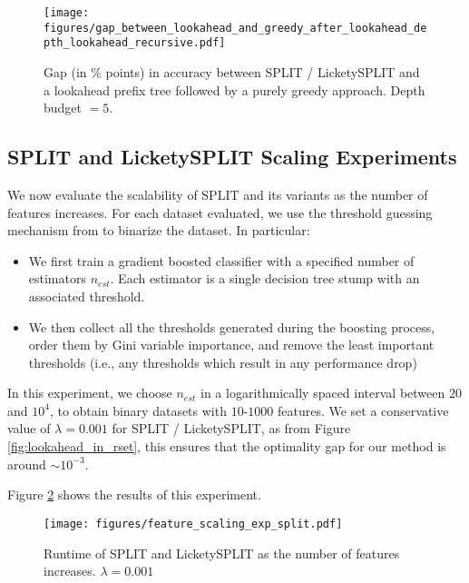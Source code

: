 \begin{figure}[H]
    \centering
    \texttt{[image: figures/gap\_between\_lookahead\_and\_greedy\_after\_lookahead\_depth\_lookahead\_recursive.pdf]}
    \caption{Gap (in $\%$ points) in accuracy between SPLIT / LicketySPLIT and a lookahead prefix tree followed by a purely greedy approach. Depth budget $= 5$. }\label{fig:gap_between_lookahead_and_greedy_after_lookahead_depth_lookahead_recursive}
\end{figure}
\subsection{SPLIT and LicketySPLIT Scaling Experiments}
\label{sec:split_scaling}
We now evaluate the scalability of SPLIT and its variants as the number of features increases. For each dataset evaluated, we use the threshold guessing mechanism from \cite{gosdt_guesses} to binarize the dataset. In particular:
\begin{itemize}
    \item We first train a gradient boosted classifier with a specified number of estimators $n_{est}$. Each estimator is a single decision tree stump with an associated threshold. 
    \item We then collect all the thresholds generated during the boosting process, order them by Gini variable importance, and remove the least important thresholds (i.e., any thresholds which result in any performance drop)
\end{itemize}
In this experiment, we choose $n_{est}$ in a logarithmically spaced interval between $20$ and $10^4$, to obtain binary datasets with $10$-$1000$ features. We set a conservative value of $\lambda = 0.001$ for SPLIT / LicketySPLIT, as from Figure \ref{fig:lookahead_in_rset}, this ensures that the optimality gap for our method is around $\sim 10^{-3}$.

Figure \ref{fig:feature_scaling_exp_split} shows the results of this experiment.
\begin{figure}[H]
    \centering
    \texttt{[image: figures/feature\_scaling\_exp\_split.pdf]}
    \caption{Runtime of SPLIT and LicketySPLIT as the number of features increases. $\lambda = 0.001$}
    \label{fig:feature_scaling_exp_split}
\end{figure}

